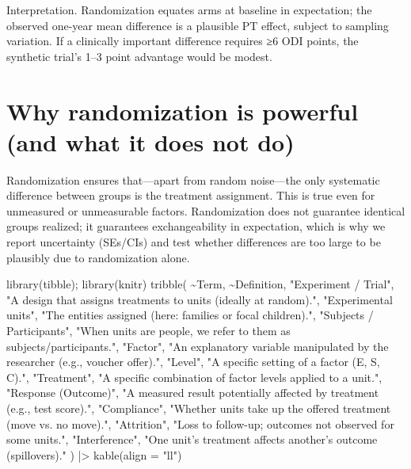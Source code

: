 \documentclass[
  letterpaper,
  DIV=11,
  numbers=noendperiod]{scrreprt}
\newenvironment{Shaded}{\begin{snugshade}}{\end{snugshade}}
\newcommand{\AttributeTok}[1]{\textcolor[rgb]{0.40,0.45,0.13}{#1}}
\newcommand{\FunctionTok}[1]{\textcolor[rgb]{0.28,0.35,0.67}{#1}}
\newcommand{\NormalTok}[1]{\textcolor[rgb]{0.00,0.23,0.31}{#1}}
\newcommand{\SpecialCharTok}[1]{\textcolor[rgb]{0.37,0.37,0.37}{#1}}
\newcommand{\StringTok}[1]{\textcolor[rgb]{0.13,0.47,0.30}{#1}}
\begin{document}
Interpretation. Randomization equates arms at baseline in expectation;
the observed one-year mean difference is a plausible PT effect, subject
to sampling variation. If a clinically important difference requires ≥6
ODI points, the synthetic trial's 1--3 point advantage would be modest.

\section{Why randomization is powerful (and what it does not
do)}\label{why-randomization-is-powerful-and-what-it-does-not-do}

Randomization ensures that---apart from random noise---the only
systematic difference between groups is the treatment assignment. This
is true even for unmeasured or unmeasurable factors. Randomization does
not guarantee identical groups realized; it guarantees exchangeability
in expectation, which is why we report uncertainty (SEs/CIs) and test
whether differences are too large to be plausibly due to randomization
alone.

\begin{Shaded}
\begin{Highlighting}[]
\FunctionTok{library}\NormalTok{(tibble); }\FunctionTok{library}\NormalTok{(knitr)}
\FunctionTok{tribble}\NormalTok{(}
  \SpecialCharTok{\textasciitilde{}}\NormalTok{Term, }\SpecialCharTok{\textasciitilde{}}\NormalTok{Definition,}
  \StringTok{"Experiment / Trial"}\NormalTok{, }\StringTok{"A design that assigns treatments to units (ideally at random)."}\NormalTok{,}
  \StringTok{"Experimental units"}\NormalTok{, }\StringTok{"The entities assigned (here: families or focal children)."}\NormalTok{,}
  \StringTok{"Subjects / Participants"}\NormalTok{, }\StringTok{"When units are people, we refer to them as subjects/participants."}\NormalTok{,}
  \StringTok{"Factor"}\NormalTok{, }\StringTok{"An explanatory variable manipulated by the researcher (e.g., voucher offer)."}\NormalTok{,}
  \StringTok{"Level"}\NormalTok{, }\StringTok{"A specific setting of a factor (E, S, C)."}\NormalTok{,}
  \StringTok{"Treatment"}\NormalTok{, }\StringTok{"A specific combination of factor levels applied to a unit."}\NormalTok{,}
  \StringTok{"Response (Outcome)"}\NormalTok{, }\StringTok{"A measured result potentially affected by treatment (e.g., test score)."}\NormalTok{,}
  \StringTok{"Compliance"}\NormalTok{, }\StringTok{"Whether units take up the offered treatment (move vs. no move)."}\NormalTok{,}
  \StringTok{"Attrition"}\NormalTok{, }\StringTok{"Loss to follow{-}up; outcomes not observed for some units."}\NormalTok{,}
  \StringTok{"Interference"}\NormalTok{, }\StringTok{"One unit’s treatment affects another’s outcome (spillovers)."}
\NormalTok{) }\SpecialCharTok{|\textgreater{}} 
  \FunctionTok{kable}\NormalTok{(}\AttributeTok{align =} \StringTok{"ll"}\NormalTok{)}
\end{Highlighting}
\end{Shaded}
\end{document}
